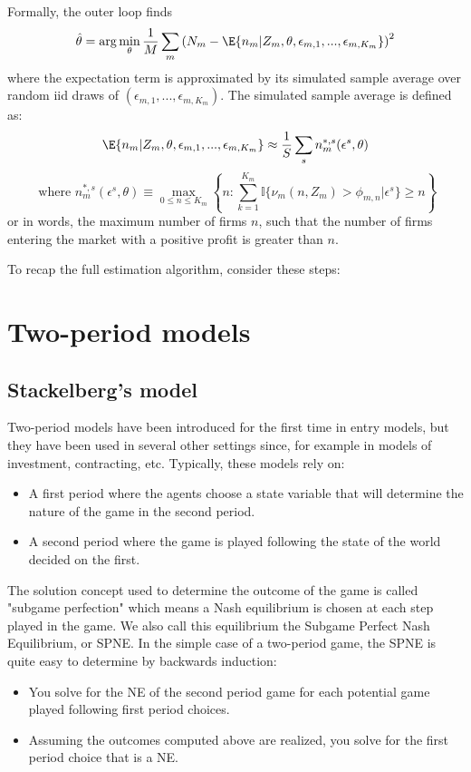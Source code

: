 Formally, the outer loop finds $$\hat\theta = \arg\min_{\theta} \frac{1}{M} \sum_{m} \left( N_m - \E{n_m\vert Z_m, \theta, \epsilon_{m,1}, ..., \epsilon_{m,K_m}} \right)^2 $$ where the expectation term is approximated by its simulated sample average over random iid draws of $(\epsilon_{m,1}, ..., \epsilon_{m,K_m})$. The simulated sample average is defined as: $$\E{n_m\vert Z_m, \theta, \epsilon_{m,1}, ..., \epsilon_{m,K_m}} \approx \frac{1}{S} \sum_{s} n_{m}^{*, s} (\epsilon^s, \theta) $$ $$\text{ where } n_{m}^{*, s} (\epsilon^s, \theta) \equiv \max_{0\leq n \leq K_m} \left\lbrace n : \sum_{k=1}^{K_m}\mathbb{I}\{\nu_m(n, Z_m) > \phi_{m,n}\vert \epsilon^s \}\geq n \right\rbrace $$ or in words, the maximum number of firms $n$, such that the number of firms entering the market with a positive profit is greater than $n$.

To recap the full estimation algorithm, consider these steps:



\section{Two-period models}

\subsection{Stackelberg's model}

Two-period models have been introduced for the first time in entry models, but they have been used in several other settings since, for example in models of investment, contracting, etc. Typically, these models rely on:\begin{itemize}
\item A first period where the agents choose a state variable that will determine the nature of the game in the second period.
\item A second period where the game is played following the state of the world decided on the first.
\end{itemize}
The solution concept used to determine the outcome of the game is called "subgame perfection" which means a Nash equilibrium is chosen at each step played in the game. We also call this equilibrium the Subgame Perfect Nash Equilibrium, or SPNE. In the simple case of a two-period game, the SPNE is quite easy to determine by backwards induction:\begin{itemize}
\item You solve for the NE of the second period game for each potential game played following first period choices.
\item Assuming the outcomes computed above are realized, you solve for the first period choice that is a NE.
\end{itemize}

